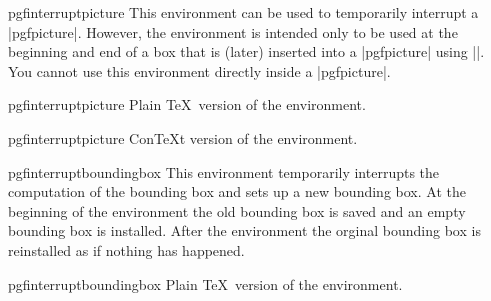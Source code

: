 \begin{environment}{{pgfinterruptpicture}}
  This environment can be used to temporarily interrupt a
  |{pgfpicture}|. However, the environment is intended only to be used
  at the beginning and end of a box that is (later) inserted into a
  |{pgfpicture}| using |\pgfqbox|. You cannot use this environment
  directly inside a |{pgfpicture}|.

\end{environment}

\begin{plainenvironment}{{pgfinterruptpicture}}
  Plain \TeX\ version of the environment.
\end{plainenvironment}

\begin{contextenvironment}{{pgfinterruptpicture}}
  Con\TeX t version of the environment.
\end{contextenvironment}



\begin{environment}{{pgfinterruptboundingbox}}
  This environment temporarily interrupts the computation of the
  bounding box and sets up a new bounding box. At the beginning of the
  environment the old bounding box is saved and an empty bounding box
  is installed. After the environment the orginal bounding box is
  reinstalled as if nothing has happened.
\end{environment}

\begin{plainenvironment}{{pgfinterruptboundingbox}}
  Plain \TeX\ version of the environment.
\end{plainenvironment}

